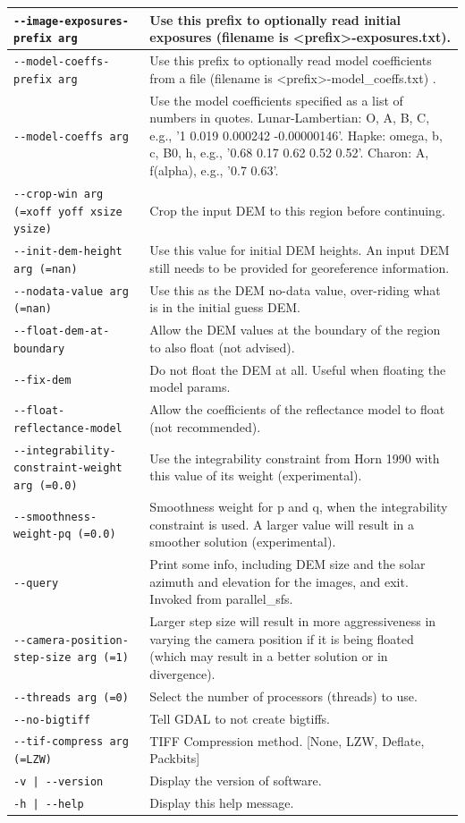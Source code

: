 \begin{longtable}{|l|p{7.5cm}|}
\texttt{-\/-image-exposures-prefix arg} & Use this prefix to optionally read initial exposures (filename is <prefix>-exposures.txt).\\ \hline
\texttt{-\/-model-coeffs-prefix arg} & Use this prefix to optionally read model coefficients from a file (filename is <prefix>-model\_coeffs.txt) .\\ \hline
\texttt{-\/-model-coeffs arg} & Use the model coefficients specified as a list of numbers in quotes. Lunar-Lambertian: O, A, B, C, e.g., '1 0.019 0.000242 -0.00000146'. Hapke: omega, b, c, B0, h, e.g., '0.68 0.17 0.62 0.52 0.52'. Charon: A, f(alpha), e.g., '0.7 0.63'.\\ \hline
\texttt{-\/-crop-win arg (=xoff yoff xsize ysize)} & Crop the input DEM to this region before continuing.\\ \hline
\texttt{-\/-init-dem-height arg (=nan)} & Use this value for initial DEM heights. An input DEM still needs to be provided for georeference information.\\ \hline
\texttt{-\/-nodata-value arg (=nan)} & Use this as the DEM no-data value, over-riding what is in the initial guess DEM.\\ \hline
\texttt{-\/-float-dem-at-boundary} & Allow the DEM values at the boundary of the region to also float (not advised).\\ \hline
\texttt{-\/-fix-dem} & Do not float the DEM at all. Useful when floating the model params.\\ \hline
\texttt{-\/-float-reflectance-model} & Allow the coefficients of the reflectance model to float (not recommended).\\ \hline
\texttt{-\/-integrability-constraint-weight arg (=0.0)} & Use the integrability constraint from Horn 1990 with this value of its weight (experimental).\\ \hline
\texttt{-\/-smoothness-weight-pq (=0.0)} & Smoothness weight for p and q, when the integrability constraint is used. A larger value will result in a smoother solution (experimental).\\ \hline
\texttt{-\/-query} & Print some info, including DEM size and the solar azimuth and elevation for the images, and exit. Invoked from parallel\_sfs.\\ \hline
\texttt{-\/-camera-position-step-size arg (=1)} & Larger step size will result in more aggressiveness in varying the camera position if it is being floated (which may result in a better solution or in divergence).\\ \hline
\texttt{-\/-threads arg (=0)} & Select the number of processors (threads) to use.\\ \hline
\texttt{-\/-no-bigtiff} & Tell GDAL to not create bigtiffs.\\ \hline
\texttt{-\/-tif-compress arg (=LZW)} & TIFF Compression method. [None, LZW, Deflate, Packbits]\\ \hline
\texttt{-v | -\/-version } & Display the version of software.\\ \hline
\texttt{-h | -\/-help } & Display this help message.\\ \hline
\end{longtable}

